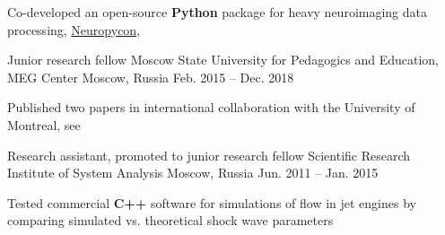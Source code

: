 \begin{cventries}
{\begin{cvitems}
          \item{Co-developed an open-source \textbf{Python} package for heavy neuroimaging data processing, \href{https://github.com/neuropycon}{Neuropycon}, \cite{Neuropycon}}
      \end{cvitems}
    }
  \cventry
    {Junior research fellow}
    {Moscow State University for Pedagogics and Education, MEG Center}
    {Moscow, Russia}
    {Feb. 2015 -- Dec. 2018}
    {
      \begin{cvitems}
      \item{Published two papers in international collaboration with the University of Montreal, see \cite{Alamian2017a, Alamian2017b}}
      \end{cvitems}
    }
  \cventry
    {Research assistant, promoted to junior research fellow}
    {Scientific Research Institute of System Analysis}
    {Moscow, Russia}
    {Jun. 2011 -- Jan. 2015}
    {
      \begin{cvitems}
        \item{Tested commercial \textbf{C++} software for simulations of flow in jet engines by comparing simulated vs. theoretical shock wave parameters}
      \end{cvitems}
    }
\end{cventries}
